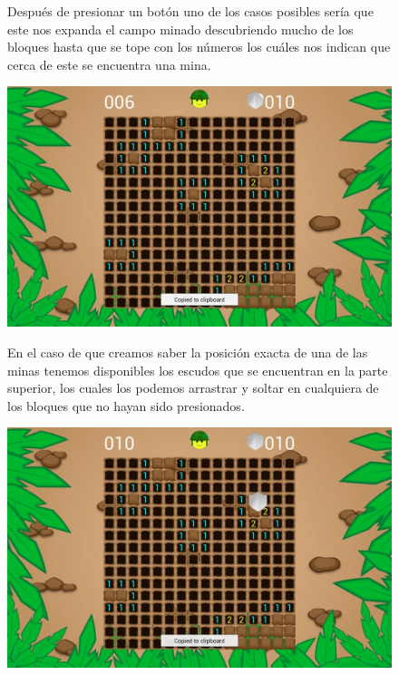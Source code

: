 \documentclass[11pt]{article}
\begin{document}
\begin{figure}[h!]
\begin{minipage}{0.5 \textwidth}
Después de presionar un botón uno de los casos posibles sería que este nos expanda el campo minado descubriendo mucho de los bloques hasta que se tope con los números los cuáles nos indican que cerca de este se encuentra una mina.
\end{minipage}
\hfill \begin{minipage}{6.5cm}
\begin{center}
 \includegraphics[width=1\textwidth]{images/screenshot5}
\end{center}
\end{minipage}
\end{figure}

\begin{figure}[h!]
\begin{minipage}{0.5 \textwidth}
En el caso de que creamos saber la posición exacta de una de las minas tenemos disponibles los escudos que se encuentran en la parte superior, los cuales los podemos arrastrar y soltar en cualquiera de los bloques que no hayan sido presionados.
\end{minipage}
\hfill \begin{minipage}{6.5cm}
\begin{center}
 \includegraphics[width=1\textwidth]{images/screenshot6}
\end{center}
\end{minipage}
\end{figure}
\end{document}
